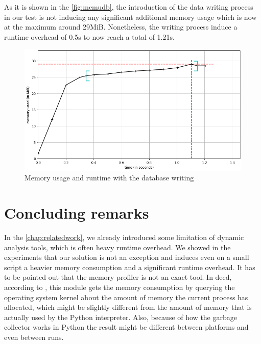 As it is shown in the \autoref{fig:memudb}, the introduction of the data writing process in our test is not inducing any significant additional memory usage which is now at the maximum around 29MiB. Nonetheless, the writing process induce a runtime overhead of 0.5s to now reach a total of 1.21s.
\begin{figure}[h!]
  \centering
    \includegraphics[width=\textwidth]{figures/experiments_figure_db.png}
    \caption{Memory usage and runtime with the database writing}
    \label{fig:memudb}
\end{figure}

\section{Concluding remarks}

In the \autoref{chap:relatedwork}, we already introduced some limitation of dynamic analysis tools, which is often heavy runtime overhead. We showed in the experiments that our solution is not an exception and induces even on a small script a heavier memory consumption and a significant runtime overhead. It has to be pointed out that the memory profiler is not an exact tool. In deed, according to \cite{Pedregos2016}, this module gets the memory consumption by querying the operating system kernel about the amount of memory the current process has allocated, which might be slightly different from the amount of memory that is actually used by the Python interpreter. Also, because of how the garbage collector works in Python the result might be different between platforms and even between runs.
